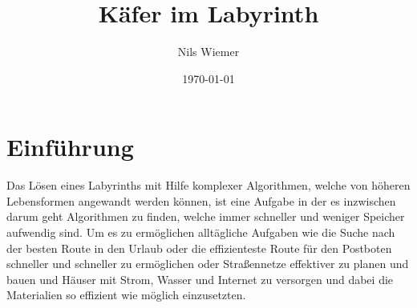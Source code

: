 \documentclass[12pt, a4paper, titlepage]{article}
\title{Käfer im Labyrinth}
\author{Nils Wiemer}
\date{\today}
\begin{document}
\maketitle









\tableofcontents

\newpage

\section{Einführung}

Das Lösen eines Labyrinths mit Hilfe komplexer Algorithmen, welche von höheren Lebensformen angewandt werden können, ist eine Aufgabe in der es inzwischen darum geht Algorithmen zu finden, welche immer schneller und weniger Speicher aufwendig sind.
Um es zu ermöglichen alltägliche Aufgaben wie die Suche nach der besten Route in den Urlaub oder die effizienteste Route für den Postboten schneller und schneller zu ermöglichen oder Straßennetze effektiver zu planen und bauen und Häuser mit Strom, Wasser und Internet zu versorgen und dabei die Materialien so effizient wie möglich einzusetzten.
\end{document}
